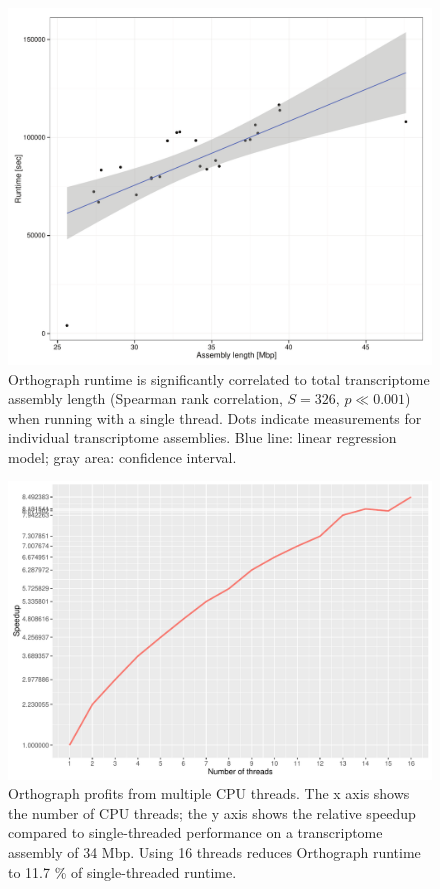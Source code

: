 \newpage

\begin{figure}[htbp]
\centering
\includegraphics[width=\textwidth]{figures/runtime-vs-length.pdf}
\caption[Orthograph runtime is correlated to assembly length]{Orthograph
runtime is significantly correlated to total transcriptome assembly
length (Spearman rank correlation, $S = 326$, $p \ll 0.001$) when
running with a single thread. Dots indicate measurements for individual
transcriptome assemblies. Blue line: linear regression model; gray area:
confidence interval.}
\label{fig:runtime-vs-length}
\end{figure}

\newpage

\begin{figure}[htbp]
\centering
\includegraphics[width=\textwidth]{figures/runtime-speedup.pdf}
\caption[Orthograph multithreading speedup graph]{Orthograph profits
from multiple CPU threads. The x axis shows the number of CPU threads;
the y axis shows the relative speedup compared to single-threaded
performance on a transcriptome assembly of 34 Mbp. Using 16 threads
reduces Orthograph runtime to 11.7 \% of single-threaded runtime.}
\label{fig:runtime-speedup}
\end{figure}

